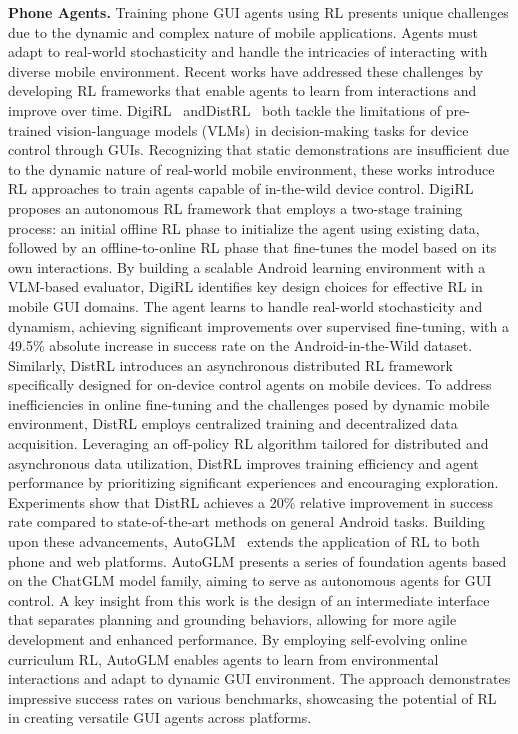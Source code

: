 \noindent\textbf{Phone Agents.}
Training phone GUI agents using RL presents unique challenges due to the dynamic and complex nature of mobile applications. Agents must adapt to real-world stochasticity and handle the intricacies of interacting with diverse mobile environment. Recent works have addressed these challenges by developing RL frameworks that enable agents to learn from interactions and improve over time.
DigiRL~\cite{bai2024digirl} andDistRL~\cite{wang2024distrl} both tackle the limitations of pre-trained vision-language models (VLMs) in decision-making tasks for device control through GUIs. Recognizing that static demonstrations are insufficient due to the dynamic nature of real-world mobile environment, these works introduce RL approaches to train agents capable of in-the-wild device control.
DigiRL proposes an autonomous RL framework that employs a two-stage training process: an initial offline RL phase to initialize the agent using existing data, followed by an offline-to-online RL phase that fine-tunes the model based on its own interactions. By building a scalable Android learning environment with a VLM-based evaluator, DigiRL identifies key design choices for effective RL in mobile GUI domains. The agent learns to handle real-world stochasticity and dynamism, achieving significant improvements over supervised fine-tuning, with a 49.5\% absolute increase in success rate on the Android-in-the-Wild dataset.
Similarly, DistRL introduces an asynchronous distributed RL framework specifically designed for on-device control agents on mobile devices. To address inefficiencies in online fine-tuning and the challenges posed by dynamic mobile environment, DistRL employs centralized training and decentralized data acquisition. Leveraging an off-policy RL algorithm tailored for distributed and asynchronous data utilization, DistRL improves training efficiency and agent performance by prioritizing significant experiences and encouraging exploration. Experiments show that DistRL achieves a 20\% relative improvement in success rate compared to state-of-the-art methods on general Android tasks.
Building upon these advancements, AutoGLM~\cite{liu2024autoglm} extends the application of RL to both phone and web platforms. AutoGLM presents a series of foundation agents based on the ChatGLM model family, aiming to serve as autonomous agents for GUI control. A key insight from this work is the design of an intermediate interface that separates planning and grounding behaviors, allowing for more agile development and enhanced performance. By employing self-evolving online curriculum RL, AutoGLM enables agents to learn from environmental interactions and adapt to dynamic GUI environment. The approach demonstrates impressive success rates on various benchmarks, showcasing the potential of RL in creating versatile GUI agents across platforms.

